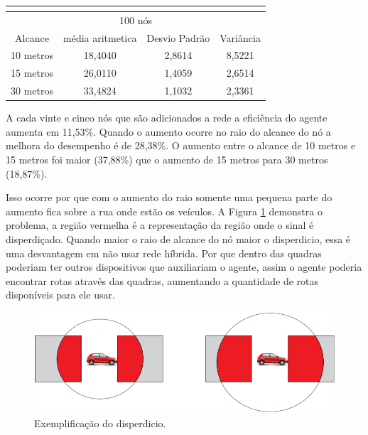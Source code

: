 \begin{table}[!htb]
\begin{minipage}{.5\linewidth}
\begin{tabular}{|c|c|c|c|}
			\multicolumn{4}{|c|}{} \\ \hline


			\multicolumn{4}{|c|}{100 nós} \\ \hline
			Alcance   & média aritmetica &	Desvio Padrão &	Variância  \\ \hline
			10 metros &	18,4040	& 2,8614 & 8,5221  \\ \hline
			15 metros &	26,0110	& 1,4059 & 2,6514  \\ \hline
			30 metros &	33,4824	& 1,1032 & 2,3361 \\ \hline

		\end{tabular}

	    \end{minipage} 
	\end{table}

A cada vinte e cinco nós que são adicionados a rede a eficiência do agente aumenta em 11,53\%. Quando o aumento ocorre no raio do alcance do nó a melhora do desempenho é de 28,38\%. O aumento entre o alcance de 10 metros e 15 metros foi maior (37,88\%) que o aumento de 15 metros para 30 metros (18,87\%). 

Isso ocorre por que com o aumento do raio somente uma pequena parte do aumento fica sobre a rua onde estão os veículos. A Figura \ref{fig:problemaDisperdicio} demonstra o problema, a região vermelha é a representação da região onde o sinal é disperdiçado. Quando maior o raio de alcance do nó maior o disperdicio, essa é uma desvantagem em não usar rede híbrida. Por que dentro das quadras poderiam ter outros dispositivos que auxiliariam o agente, assim o agente poderia encontrar rotas através das quadras, aumentando a quantidade de rotas disponíveis para ele usar.

\begin{figure}[htbp]
		\centering
		\includegraphics[scale=0.5]{resultados/figuras/problemaDisperdicio.pdf}
		\caption{Exemplificação do disperdicio.}
		\label{fig:problemaDisperdicio}
	\end{figure}

